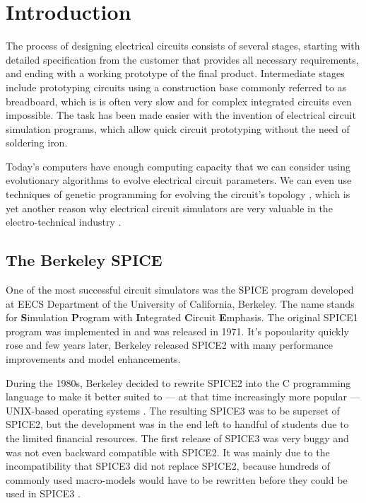 \chapter*{Introduction}

The process of designing electrical circuits consists of several stages, starting with detailed specification from the customer that provides all necessary requirements,
and ending with a working prototype of the final product. Intermediate stages include prototyping circuits using a construction base commonly referred to as breadboard, which is is often
very slow and for complex integrated circuits even impossible. The task has been made easier with the invention of electrical circuit simulation programs, which allow quick circuit prototyping
without the need of soldering iron.

Today's computers have enough computing capacity that we can consider using evolutionary algorithms to evolve electrical circuit parameters. We can even
use techniques of genetic programming for evolving the circuit's topology , which is yet another reason why
electrical circuit simulators are very valuable in the electro-technical industry  .

\section{The Berkeley SPICE}
One of the most successful circuit simulators was the SPICE program developed at EECS Department of the University of California, Berkeley. The name stands for \textbf{S}imulation \textbf{P}rogram with \textbf{I}ntegrated \textbf{C}ircuit \textbf{E}mphasis. The original SPICE1 program was implemented in  and was released in 1971. It's popoularity quickly rose and few years later, Berkeley released SPICE2 with many performance improvements and model enhancements.

During the 1980s, Berkeley decided to rewrite SPICE2 into the C programming language to make it better suited to --- at that time increasingly more popular --- UNIX-based operating systems \cite{spice_book}. The resulting SPICE3 was to be superset of SPICE2, but the development was in the end left to handful of students due to the limited financial resources. The first release of SPICE3 was very buggy and was not even backward compatible with SPICE2. It was mainly due to the incompatibility that SPICE3 did not replace SPICE2, because hundreds of commonly used macro-models would have to be rewritten before they could be used in SPICE3 \cite{inside_spice}.

